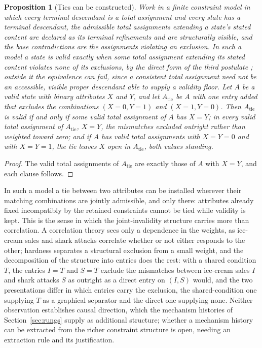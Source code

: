 \documentclass[11pt]{article}
\newtheorem{proposition}{Proposition}
\begin{document}
\begin{proposition}[Ties can be constructed]\label{prop:tie}
Work in a finite constraint model in which every terminal descendant is a total assignment and every state has a terminal descendant, the admissible total assignments extending a state's stated content are declared as its terminal refinements and are structurally visible, and the base contradictions are the assignments violating an exclusion. In such a model a state is valid exactly when some total assignment extending its stated content violates none of its exclusions, by the direct form of the third postulate \cite{Aethus}; outside it the equivalence can fail, since a consistent total assignment need not be an accessible, visible proper descendant able to supply a validity floor. Let $A$ be a valid state with binary attributes $X$ and $Y$, and let $A_{\mathrm{tie}}$ be $A$ with one entry added that excludes the combinations $(X = 0, Y = 1)$ and $(X = 1, Y = 0)$. Then $A_{\mathrm{tie}}$ is valid if and only if some valid total assignment of $A$ has $X = Y$; in every valid total assignment of $A_{\mathrm{tie}}$, $X = Y$, the mismatches excluded outright rather than weighted toward zero; and if $A$ has valid total assignments with $X = Y = 0$ and with $X = Y = 1$, the tie leaves $X$ open in $A_{\mathrm{tie}}$, both values standing.
\end{proposition}
\begin{proof}
The valid total assignments of $A_{\mathrm{tie}}$ are exactly those of $A$ with $X = Y$, and each clause follows.
\end{proof}

\noindent In such a model a tie between two attributes can be installed wherever their matching combinations are jointly admissible, and only there: attributes already fixed incompatibly by the retained constraints cannot be tied while validity is kept. This is the sense in which the joint-invalidity structure carries more than correlation. A correlation theory sees only a dependence in the weights, as ice-cream sales and shark attacks correlate whether or not either responds to the other; hardness separates a structural exclusion from a small weight, and the decomposition of the structure into entries does the rest: with a shared condition $T$, the entries $I = T$ and $S = T$ exclude the mismatches between ice-cream sales $I$ and shark attacks $S$ as outright as a direct entry on $(I, S)$ would, and the two presentations differ in which entries carry the exclusion, the shared-condition one supplying $T$ as a graphical separator and the direct one supplying none. Neither observation establishes causal direction, which the mechanism histories of Section~\ref{sec:rungs} supply as additional structure; whether a mechanism history can be extracted from the richer constraint structure is open, needing an extraction rule and its justification.
\end{document}
